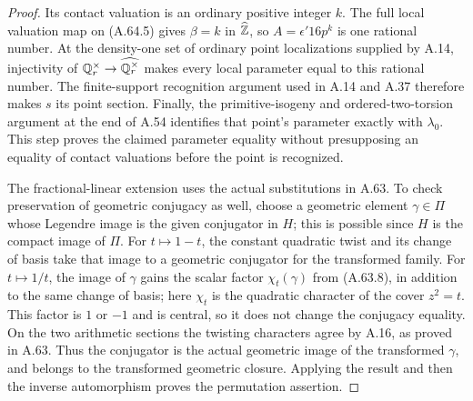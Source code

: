 \begin{proof}
Its contact valuation is an ordinary positive integer $k$.
The full local valuation map on (A.64.5) gives
$\beta=k$ in $\widehat{\mathbb Z}$, so $A=\epsilon'16p^k$
is one rational number.  At the density-one set of ordinary
point localizations supplied by A.14, injectivity of
$\mathbb Q_r^\times\to\widehat{\mathbb Q_r^\times}$ makes every
local parameter equal to this rational number.
The finite-support recognition argument used in A.14 and
A.37 therefore makes $s$ its point section.
Finally, the primitive-isogeny and ordered-two-torsion
argument at the end of A.54 identifies that point's
parameter exactly with $\lambda_0$.  This step proves the
claimed parameter equality without presupposing an equality
of contact valuations before the point is recognized.

The fractional-linear extension uses the actual substitutions
in A.63.  To check preservation of geometric conjugacy as
well, choose a geometric element $\gamma\in\Pi$ whose
Legendre image is the given conjugator in $H$; this is
possible since $H$ is the compact image of $\Pi$.
For $t\mapsto1-t$, the constant quadratic twist and its
change of basis take that image to a geometric conjugator
for the transformed family.  For $t\mapsto1/t$, the image
of $\gamma$ gains the scalar factor $\chi_t(\gamma)$
from (A.63.8), in addition to the same change of basis;
here $\chi_t$ is the quadratic character of the cover $z^2=t$.
This factor is $1$ or $-1$ and is central, so it does not
change the conjugacy equality.
On the two arithmetic sections the twisting characters
agree by A.16, as proved in A.63.
Thus the conjugator is the actual geometric image of
the transformed $\gamma$, and belongs to the transformed
geometric closure.  Applying the result and then the
inverse automorphism proves the permutation assertion.
\end{proof}
